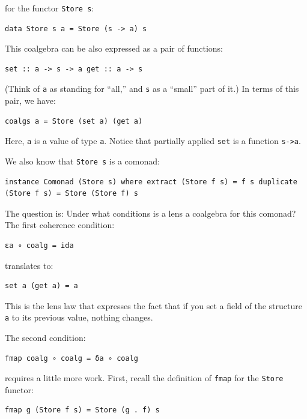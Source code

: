 for the functor \texttt{Store\ s}:

\begin{verbatim}
data Store s a = Store (s -> a) s
\end{verbatim}

This coalgebra can be also expressed as a pair of functions:

\begin{verbatim}
set :: a -> s -> a get :: a -> s
\end{verbatim}

(Think of \texttt{a} as standing for ``all,'' and \texttt{s} as a
``small'' part of it.) In terms of this pair, we have:

\begin{verbatim}
coalgs a = Store (set a) (get a)
\end{verbatim}

Here, \texttt{a} is a value of type \texttt{a}. Notice that partially
applied \texttt{set} is a function \texttt{s-\textgreater{}a}.

We also know that \texttt{Store\ s} is a comonad:

\begin{verbatim}
instance Comonad (Store s) where extract (Store f s) = f s duplicate (Store f s) = Store (Store f) s
\end{verbatim}

The question is: Under what conditions is a lens a coalgebra for this
comonad? The first coherence condition:

\begin{verbatim}
εa ∘ coalg = ida
\end{verbatim}

translates to:

\begin{verbatim}
set a (get a) = a
\end{verbatim}

This is the lens law that expresses the fact that if you set a field of
the structure \texttt{a} to its previous value, nothing changes.

The second condition:

\begin{verbatim}
fmap coalg ∘ coalg = δa ∘ coalg
\end{verbatim}

requires a little more work. First, recall the definition of
\texttt{fmap} for the \texttt{Store} functor:

\begin{verbatim}
fmap g (Store f s) = Store (g . f) s
\end{verbatim}

